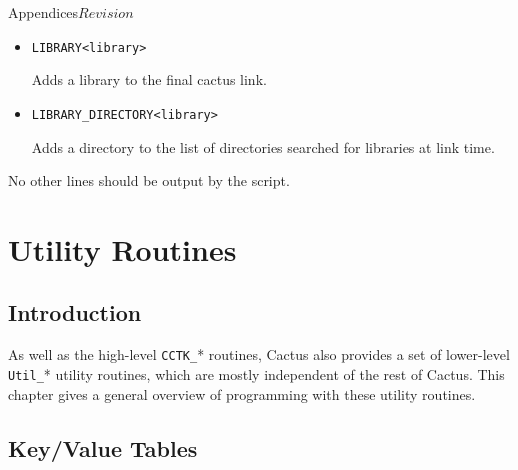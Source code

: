\begin{cactuspart}{Appendices}{}{$Revision$}
\begin{itemize}
\begin{alltt}
BEGIN MAKE_DEPENDENCY 
<text>
END MAKE_DEPENDENCY 
\end{alltt}

Adds makefile dependency information into the compilation of all
thorns using this capability.

\item

\begin{alltt}
LIBRARY <library>
\end{alltt}

Adds a library to the final cactus link.

\item

\begin{alltt}
LIBRARY_DIRECTORY <library>
\end{alltt}

Adds a directory to the list of directories searched for libraries at
link time.

\end{itemize}

No other lines should be output by the script.


\chapter{Utility Routines}

\section{Introduction}

As well as the high-level \verb|CCTK_|* routines, Cactus also
provides a set of lower-level \verb|Util_|* utility routines, which
are mostly independent of the rest of Cactus.  This chapter gives a
general overview of programming with these utility routines.


\section{Key/Value Tables}


\end{cactuspart}
